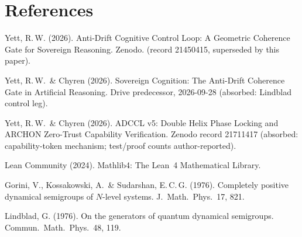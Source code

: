 \documentclass{alienfolio}
\begin{document}
\section*{References}
Yett, R.\,W. (2026). Anti-Drift Cognitive Control Loop: A Geometric
Coherence Gate for Sovereign Reasoning. Zenodo.
 (record 21450415, superseded by this paper).

Yett, R.\,W.\ \& Chyren (2026). Sovereign Cognition: The Anti-Drift
Coherence Gate in Artificial Reasoning. Drive predecessor, 2026-09-28
(absorbed: Lindblad control leg).

Yett, R.\,W.\ \& Chyren (2026). ADCCL v5: Double Helix Phase Locking and
ARCHON Zero-Trust Capability Verification. Zenodo record 21711417 (absorbed:
capability-token mechanism; test/proof counts author-reported).

Lean Community (2024). Mathlib4: The Lean~4 Mathematical Library.

Gorini, V., Kossakowski, A.\ \& Sudarshan, E.\,C.\,G. (1976). Completely
positive dynamical semigroups of $N$-level systems. J.\ Math.\ Phys.\ 17, 821.

Lindblad, G. (1976). On the generators of quantum dynamical semigroups.
Commun.\ Math.\ Phys.\ 48, 119.
\end{document}
